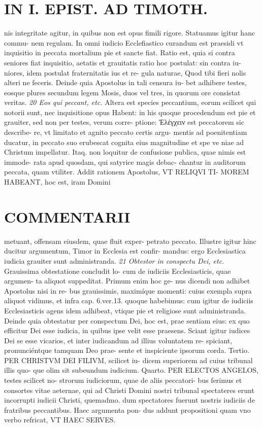 \documentclass{article}
\begin{document}
\begin{pages}
\section*{IN I. EPIST. AD TIMOTH. }
\marginpar{[ p.135. ]}\pstart nis integritate agitur, in quibus non est opus fimili rigore. Statuamus igitur hanc commu- nem regulam. In omni iudicio Ecclefiastico curandum est praesidi vt inquisitio in peccata mortalium pie et sancte fiat. Ratio est, quia si contra seniores fiat inquisitio, aetatis et grauitatis ratio hoc postulat: sin contra iu- niores, idem postulat fraternitatis ius et re- gula naturae, Quod tibi fieri nolis alteri ne feceris.  \pend\pstart Deinde quia Apostolus in tali censura iu- bet adhibere testes, eosque plures secundum legem Mosis, duos vel tres, in quorum ore consistat veritas.  \pend
\textit{20 Eos qui peccant, etc. }\pstart Altera est species peccantium, eorum scilicet qui notorii sunt, nec inquisitione opus Habent: in his quoque procedendum est pie et grauiter, sed non per testes, verum corre- ptione: Ἐλέγχειν est peccatorem sic describe- re, vt limitato et agnito peccato certis argu- mentis ad poenitentiam ducatur, in peccato suo erubescat cognita eius magnitudine et spe ve niae ad Christum impellatur. Itaq. non loquitur de confusione publica, quae nimis est immode- rata apud quosdam, qui satyrice magis debac- chantur in auditorum peccata, quam vtiliter. Addit rationem Apostolus, VT RELIQVI TI- MOREM HABEANT, hoc est, iram Domini  \pend
\section*{COMMENTARII }
\marginpar{[ p.136 ]}\pstart metuant, offensam eiusdem, quae fluit exper- petrato peccato. Illustre igitur hinc ducitur argumentum, Timor in Ecclesia est confir- mandus: ergo Ecclesiastica iudicia grauiter sunt administranda.  \pend
\textit{21 Obtestor in conspectu Dei, etc. }\pstart Grauissima obtestatione concludit lo- cum de iudiciis Ecclesiasticis, quae argumen- ta aliquot suppeditat. Primum enim hoc ge- nus dicendi non adhibet Apostolus nisi in re- bus grauissimis, maximíque momenti: cuius exempla supra aliquot vidimus, et infra cap. 6.ver.13. quoque habebimus: cum igitur de iudiciis Ecclesiasticis agens idem adhibeat, vtique pie et religiose sunt administranda. Deinde quia obtestatur per conspectum Dei, hoc est, prae sentiam eius: ex quo efficitur Dei esse iudicia, in quibus ipse velit esse praesens.  \pend\pstart Sciant igitur iudices Dei se esse vicarios, et inter iudicandum ad illius voluntatem re- spiciant, pronunciéntque tamquam Deo prae- sente et inspiciente ipsorum corda. Tertio. PER CHRISTVM DEI FILIVM, scilicet iu- dicem superiorem ad cuius tribunal illis quo- que olim sit subeundum iudicium. Quarto. PER ELECTOS ANGELOS, testes scilicet no- strorum iudiciorum, quae de aliis peccatori- bus ferimus et consortes vitae aeternae, qui ad Christi Domini nostri tribunal spectateres  \pend\pstart erunt incorrupti iudicii Christi, quemadmo. dum spectatores fuerunt nostris iudiciis de fratribus peccantibus. Haec argumenta pon- dus addunt propositioni quam vno verbo refricat, VT HAEC SERVES.  \pend

\end{pages}
\end{document}
